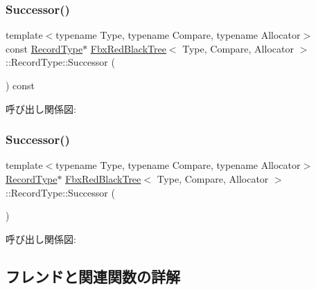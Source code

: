 \subsubsection{\texorpdfstring{Successor()}{Successor()}\hspace{0.1cm}{\footnotesize\ttfamily [1/2]}}
{\footnotesize\ttfamily template$<$typename Type, typename Compare, typename Allocator$>$ \\
const \hyperlink{class_fbx_red_black_tree_1_1_record_type}{Record\+Type}$\ast$ \hyperlink{class_fbx_red_black_tree}{Fbx\+Red\+Black\+Tree}$<$ Type, Compare, Allocator $>$\+::Record\+Type\+::\+Successor (\begin{DoxyParamCaption}{ }\end{DoxyParamCaption}) const}

呼び出し関係図\+:
\mbox{\label{class_fbx_red_black_tree_1_1_record_type_a0af352fc345ec4bfe86ba8c0c79bb337}} 
\subsubsection{\texorpdfstring{Successor()}{Successor()}\hspace{0.1cm}{\footnotesize\ttfamily [2/2]}}
{\footnotesize\ttfamily template$<$typename Type, typename Compare, typename Allocator$>$ \\
\hyperlink{class_fbx_red_black_tree_1_1_record_type}{Record\+Type}$\ast$ \hyperlink{class_fbx_red_black_tree}{Fbx\+Red\+Black\+Tree}$<$ Type, Compare, Allocator $>$\+::Record\+Type\+::\+Successor (\begin{DoxyParamCaption}{ }\end{DoxyParamCaption})}

呼び出し関係図\+:


\subsection{フレンドと関連関数の詳解}
\mbox{\label{class_fbx_red_black_tree_1_1_record_type_ad58e9ce88250221aa6b5145e8ccc237f}} 
